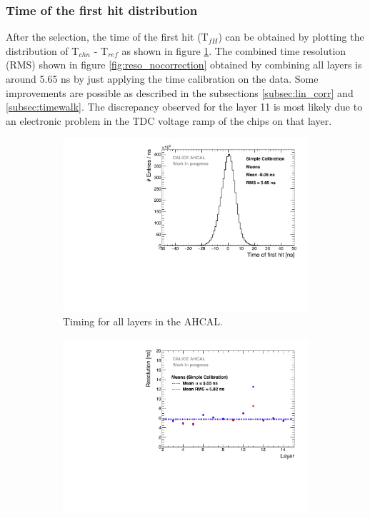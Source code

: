 \subsubsection{Time of the first hit distribution}
After the selection, the time of the first hit (T$_{fH}$) can be obtained by plotting the distribution of T$_{chn}$ - T$_{ref}$ as shown in figure \ref{fig:timing_nocorrection}. The combined time resolution (RMS) shown in figure \ref{fig:reso_nocorrection} obtained by combining all layers is around 5.65 ns by just applying the time calibration on the data. Some improvements are possible as described in the subsections \ref{subsec:lin_corr} and \ref{subsec:timewalk}. The discrepancy observed for the layer 11 is most likely due to an electronic problem in the TDC voltage ramp of the chips on that layer.

\begin{figure}[t]
	\begin{subfigure}[t]{0.45\textwidth}
		\centering
		\includegraphics[width=1\textwidth]{chap5/fig_AHCAL_timing/Muons/Timing_AHCAL_noCorrections.pdf}
		\caption{Timing for all layers in the AHCAL.}\label{fig:timing_nocorrection}
	\end{subfigure}
	\hfill
	\begin{subfigure}[t]{0.45\textwidth}
		\centering
		\includegraphics[width=1\textwidth]{chap5/fig_AHCAL_timing/Muons/ResolutionPerModule_noCorrections.pdf}

\end{subfigure}
\end{figure}
